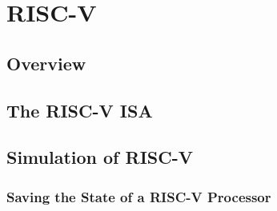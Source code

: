 \chapter{RISC-V}\label{chap:riscv}

\section{Overview}

\section{The RISC-V ISA}

\section{Simulation of RISC-V}

\subsection{Saving the State of a RISC-V Processor}\label{statefile}